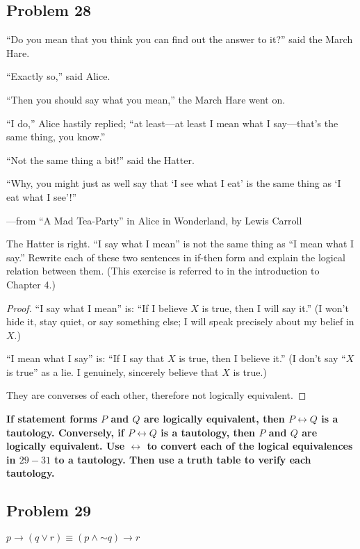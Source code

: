 \documentclass[14pt]{extarticle}
\newcommand{\bic}{\leftrightarrow}
\begin{document}
\subsection{Problem 28}
“Do you mean that you think you can find out the answer to it?” said the March
Hare.

“Exactly so,” said Alice.

“Then you should say what you mean,” the March Hare went on.

“I do,” Alice hastily replied; “at least—at least I mean what I say—that’s the
same thing, you know.”

“Not the same thing a bit!” said the Hatter.

“Why, you might just as well say that ‘I see what I eat’ is the same thing as ‘I
eat what I see’!”

—from “A Mad Tea-Party” in Alice in Wonderland, by Lewis Carroll

The Hatter is right. “I say what I mean” is not the same thing as “I mean what I
say.” Rewrite each of these two sentences in if-then form and explain the
logical relation between them. (This exercise is referred to in the introduction
to Chapter 4.)

\begin{proof}
“I say what I mean” is: ``If I believe $X$ is true, then I will say it.'' (I
won't hide it, stay quiet, or say something else; I will speak precisely about
my belief in $X$.)

“I mean what I say” is: ``If I say that $X$ is true, then I believe it.'' (I
don't say ``$X$ is true'' as a lie. I genuinely, sincerely believe that $X$ is
true.)

They are converses of each other, therefore not logically equivalent.
\end{proof}

{\bf If statement forms $P$ and $Q$ are logically equivalent, then $P \bic Q$ is
a tautology. Conversely, if $P \bic Q$ is a tautology, then $P$ and $Q$ are
logically equivalent. Use $\bic$ to convert each of the logical equivalences in
$29-31$ to a tautology. Then use a truth table to verify each tautology.}

\subsection{Problem 29}
$p \to (q \vee r) \equiv (p \wedge {\sim q}) \to r$
\end{document}
